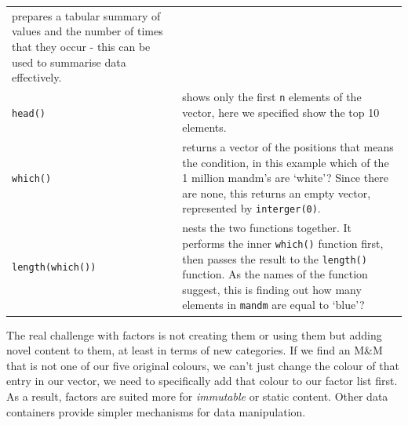 \documentclass[a4paper]{book}
\begin{document}
\begin{longtable}[]{@{}ll@{}}
\begin{minipage}[t]{0.73\columnwidth}
prepares a tabular summary of values and the number of times that they
occur - this can be used to summarise data effectively.\strut
\end{minipage}\tabularnewline
\begin{minipage}[t]{0.21\columnwidth}\raggedright\strut
\texttt{head()}\strut
\end{minipage} & \begin{minipage}[t]{0.73\columnwidth}\raggedright\strut
shows only the first \texttt{n} elements of the vector, here we
specified show the top 10 elements.\strut
\end{minipage}\tabularnewline
\begin{minipage}[t]{0.21\columnwidth}\raggedright\strut
\texttt{which()}\strut
\end{minipage} & \begin{minipage}[t]{0.73\columnwidth}\raggedright\strut
returns a vector of the positions that means the condition, in this
example which of the 1 million mandm's are `white'? Since there are
none, this returns an empty vector, represented by
\texttt{interger(0)}.\strut
\end{minipage}\tabularnewline
\begin{minipage}[t]{0.21\columnwidth}\raggedright\strut
\texttt{length(which())}\strut
\end{minipage} & \begin{minipage}[t]{0.73\columnwidth}\raggedright\strut
nests the two functions together. It performs the inner \texttt{which()}
function first, then passes the result to the \texttt{length()}
function. As the names of the function suggest, this is finding out how
many elements in \texttt{mandm} are equal to `blue'?\strut
\end{minipage}\tabularnewline
\bottomrule
\end{longtable}

The real challenge with factors is not creating them or using them but
adding novel content to them, at least in terms of new categories. If we
find an M\&M that is not one of our five original colours, we can't just
change the colour of that entry in our vector, we need to specifically
add that colour to our factor list first. As a result, factors are
suited more for \emph{immutable} or static content. Other data
containers provide simpler mechanisms for data manipulation.
\end{document}
